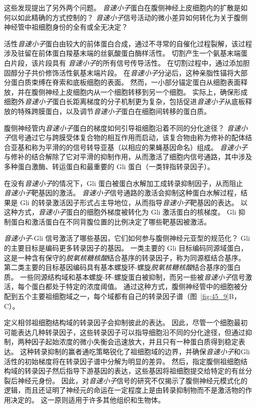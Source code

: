 这些发现提出了另外两个问题。
\textit{音速小子}蛋白在腹侧神经上皮细胞内的扩散是如何以如此精确的方式控制的？
\textit{音速小子}信号活动的微小差异如何转化为关于腹侧神经管中祖细胞身份的全有或全无决定？


活性\textit{音速小子}蛋白由较大的前体蛋白合成，通过不寻常的自催化过程裂解，该过程涉及驻留在前体蛋白羧基末端的丝氨酸蛋白酶样活性。
切割产生一个氨基末端蛋白片段，该片段具有 \textit{音速小子}的所有信号传导活性。
在切割过程中，通过添加胆固醇分子共价修饰活性氨基末端片段。
在\textit{音速小子}分泌后，这种亲脂性锚将大部分蛋白质束缚在脊索和底板细胞的表面。
然而，一小部分锚定蛋白从细胞表面释放，并在腹侧神经上皮细胞内从一个细胞转移到另一个细胞。
实际上，确保形成细胞外\textit{音速小子}蛋白长距离梯度的分子机制更为复杂，包括促进\textit{音速小子}从底板释放的特殊跨膜蛋白，以及调节\textit{音速小子}蛋白在细胞间转移的蛋白质。


腹侧神经管内\textit{音速小子}蛋白的梯度如何引导祖细胞沿着不同的分化途径？
\textit{音速小子}信号通过它与跨膜受体复合物的相互作用而启动，该复合物由称为修补的配体结合亚基和称为平滑的的信号转导亚基（以相应的果蝇基因命名）组成。
\textit{音速小子}与修补的结合解除了它对平滑的抑制作用，从而激活了细胞内信号通路，其中涉及多种蛋白激酶、转运蛋白和最重要的 Gli 蛋白（一类锌指转录因子）。


在没有\textit{音速小子}的情况下，Gli 蛋白被蛋白水解加工成转录抑制因子，从而阻止 \textit{音速小子}靶基因的激活。
\textit{音速小子}信号通路的激活会抑制这种蛋白水解过程，结果是 Gli 的转录激活因子形式占主导地位，从而指导\textit{音速小子}靶基因的表达。
以这种方式，\textit{音速小子}蛋白的细胞外梯度被转化为 Gli 激活蛋白的核梯度。
Gli 抑制蛋白和激活蛋白在不同背腹位置的比例决定了哪些靶基因被激活。


\textit{音速小子}-Gli 信号激活了哪些基因，它们如何参与腹侧神经元亚型的规范化？
Gli 的主要目标是编码更多转录因子的基因。
一类主要的 Gli 目标编码同源域蛋白，这是一种含有保守的\textit{脱氧核糖核酸}结合基序的转录因子，称为同源框结合基序。
第二类主要的目标基因编码具有基本螺旋环-螺旋\textit{脱氧核糖核酸}结合基序的蛋白质。
一些同源结构域和基本螺旋-环-螺旋蛋白被抑制，而另一些被\textit{音速小子}信号激活，每个蛋白都处于特定的浓度阈值。
通过这种方式，腹侧神经管中的细胞被分配到五个主要祖细胞域之一，每个域都有自己的转录因子谱（图~\ref{fig:45_9}B，C）。


定义相邻祖细胞结构域的转录因子会抑制彼此的表达。
因此，尽管一个细胞最初可能表达几种转录因子，这些转录因子可以指导细胞沿不同的分化途径，但通过抑制，两种因子起始浓度的微小失衡会迅速放大，并且只有一种蛋白质得到稳定表达。
这种转录抑制的赢者通吃策略锐化了祖细胞域的边界，并确保\textit{音速小子}和Gli活性的初始梯度将在转录因子谱中分解为明显的差异。
然后，指定腹侧祖细胞结构域的转录因子然后指导下游基因的表达，这些基因将祖细胞提交给特定的有丝分裂后神经元身份。
因此，对\textit{音速小子}信号的研究不仅揭示了腹侧神经元模式化的逻辑，而且还证明了神经元的命运在一定程度上是由转录抑制物而不是激活物的作用决定的。
这一原则适用于许多其他组织和生物体。


